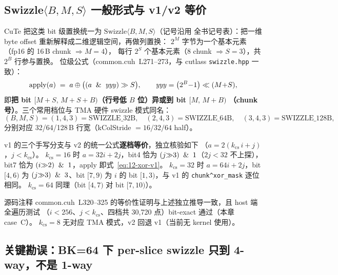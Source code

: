 \subsection{Swizzle$\langle B,M,S\rangle$ 一般形式与 v1/v2 等价}

CuTe 把这类 bit 级置换统一为 $\mathrm{Swizzle}\langle B,M,S\rangle$（记号沿用
全书记号表）：把一维 byte offset 重新解释成二维逻辑空间，再做列置换：
$2^M$ 字节为一个基本元素（fp16 的 16\,B chunk $\Rightarrow M{=}4$），
每行 $2^S$ 个基本元素（8 chunk $\Rightarrow S{=}3$），共 $2^B$ 行参与置换。
位级公式（common.cuh~L271--273，与 cutlass \texttt{swizzle.hpp} 一致）：
\begin{equation}
  \mathrm{apply}(a) \;=\; a \oplus \bigl((a \And \mathit{yyy}) \gg S\bigr),
  \qquad \mathit{yyy} = \bigl(2^B{-}1\bigr)\ll (M{+}S) ,
  \label{eq:12-apply}
\end{equation}
即\textbf{把 bit $[M{+}S,\,M{+}S{+}B)$（行号低 $B$ 位）异或到 bit $[M,\,M{+}B)$
（chunk 号）}。三个常用档位与 TMA 硬件 swizzle 模式同名：
\begin{equation}
  (B,M,S)=(1,4,3)=\text{SWIZZLE\_32B},\quad
  (2,4,3)=\text{SWIZZLE\_64B},\quad
  (3,4,3)=\text{SWIZZLE\_128B},
\end{equation}
分别对应 32/64/128\,B 行宽（kColStride $=16/32/64$ half）。

v1 的三个手写分支与 v2 的统一公式\textbf{逐档等价}，独立核验如下
（$a=2(k_{\mathrm{cs}}\,i+j)$，$j<k_{\mathrm{cs}}$）。
$k_{\mathrm{cs}}{=}16$ 时 $a=32i+2j$，bit4 恰为 $(j{\gg}3)\And1$（$2j<32$ 不上探），
bit7 恰为 $(i{\gg}2)\And1$，apply 即式~\ref{eq:12-xor-v1}。
$k_{\mathrm{cs}}{=}32$ 时 $a=64i+2j$，bit $[4,6)$ 为 $(j{\gg}3)\And3$、bit $[7,9)$
为 $i$ 的 bit $[1,3)$，与 v1 的 \texttt{chunk\^{}xor\_\allowbreak{}mask} 逐位相同。
$k_{\mathrm{cs}}{=}64$ 同理（bit $[4,7)$ 对 bit $[7,10)$）。

源码注释 common.cuh~L320--325 的等价性证明与上述独立推导一致，且 host 端全遍历测试
（$i<256$、$j<k_{\mathrm{cs}}$、四档共 30{,}720 点）bit-exact 通过（本章 case~C）。
$k_{\mathrm{cs}}{=}8$ 无对应 TMA 模式，v2 回退 v1（当前无 kernel 使用）。

\subsection{关键勘误：BK=64 下 per-slice swizzle 只到 4-way，不是 1-way}


